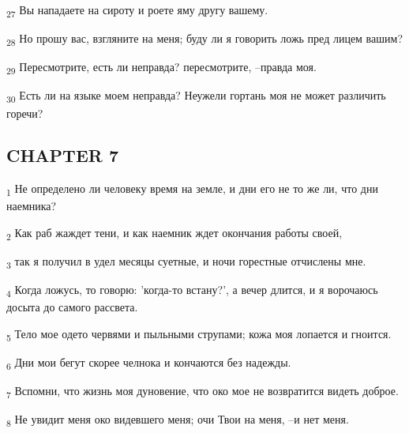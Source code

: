 \begin{tcolorbox}
\textsubscript{27} Вы нападаете на сироту и роете яму другу вашему.
\end{tcolorbox}
\begin{tcolorbox}
\textsubscript{28} Но прошу вас, взгляните на меня; буду ли я говорить ложь пред лицем вашим?
\end{tcolorbox}
\begin{tcolorbox}
\textsubscript{29} Пересмотрите, есть ли неправда? пересмотрите, --правда моя.
\end{tcolorbox}
\begin{tcolorbox}
\textsubscript{30} Есть ли на языке моем неправда? Неужели гортань моя не может различить горечи?
\end{tcolorbox}
\subsection{CHAPTER 7}
\begin{tcolorbox}
\textsubscript{1} Не определено ли человеку время на земле, и дни его не то же ли, что дни наемника?
\end{tcolorbox}
\begin{tcolorbox}
\textsubscript{2} Как раб жаждет тени, и как наемник ждет окончания работы своей,
\end{tcolorbox}
\begin{tcolorbox}
\textsubscript{3} так я получил в удел месяцы суетные, и ночи горестные отчислены мне.
\end{tcolorbox}
\begin{tcolorbox}
\textsubscript{4} Когда ложусь, то говорю: 'когда-то встану?', а вечер длится, и я ворочаюсь досыта до самого рассвета.
\end{tcolorbox}
\begin{tcolorbox}
\textsubscript{5} Тело мое одето червями и пыльными струпами; кожа моя лопается и гноится.
\end{tcolorbox}
\begin{tcolorbox}
\textsubscript{6} Дни мои бегут скорее челнока и кончаются без надежды.
\end{tcolorbox}
\begin{tcolorbox}
\textsubscript{7} Вспомни, что жизнь моя дуновение, что око мое не возвратится видеть доброе.
\end{tcolorbox}
\begin{tcolorbox}
\textsubscript{8} Не увидит меня око видевшего меня; очи Твои на меня, --и нет меня.
\end{tcolorbox}
